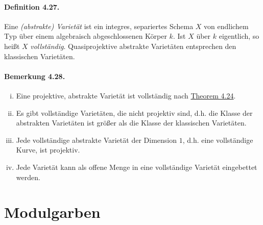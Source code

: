 \documentclass[11pt,b5paper,openany]{memoir}
\begin{document}
\paragraph{Definition 4.27.}\label{4.27} Eine \textit{(abstrakte) Varietät} ist ein integres, separiertes Schema $X$ von endlichem Typ über einem algebraisch abgeschlossenen Körper $k$. Ist $X$ über $k$ eigentlich, so heißt $X$ \textit{vollständig}. Quasiprojektive abstrakte Varietäten entsprechen den klassischen Varietäten.

\paragraph{Bemerkung 4.28.}\label{4.28}\begin{enumerate}[(i)]
\item Eine projektive, abstrakte Varietät ist vollständig nach \hyperref[4.24]{Theorem 4.24}.
\item Es gibt vollständige Varietäten, die nicht projektiv sind, d.h. die Klasse der abstrakten Varietäten ist größer als die Klasse der klassischen Varietäten.
\item Jede vollständige abstrakte Varietät der Dimension $1$, d.h. eine vollständige Kurve, ist projektiv.
\item Jede Varietät kann als offene Menge in eine vollständige Varietät eingebettet werden.
\end{enumerate}

\section{Modulgarben}
\end{document}

